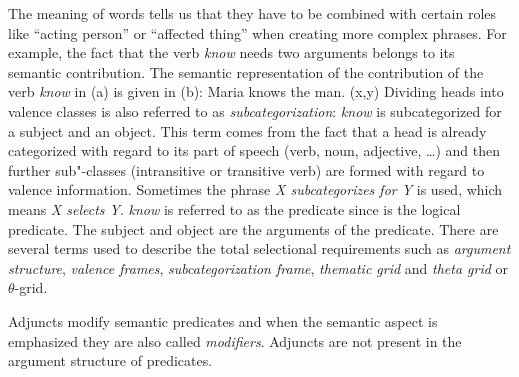 The meaning of words tells us that they have to be combined with certain roles like ``acting person'' or ``affected thing'' when creating more complex phrases.
For example, the fact that the verb \emph{know} needs two arguments belongs to its semantic contribution. The semantic representation of the contribution of the verb \emph{know} in (a) is given in (b):
\eal
\ex Maria knows the man.
\ex {}(x,y)
\zl
\noindent
Dividing heads into valence classes is also referred to as \emph{subcategorization}:\label{Seite-Subkategoriesierung} 
\emph{know} is subcategorized for a subject and an object.
This term comes from the fact that a head is already categorized with regard to its
part of speech (verb, noun, adjective, \ldots) and then further sub"-classes (\eg intransitive or
transitive verb) are formed with regard to valence information. Sometimes the phrase \emph{X subcategorizes for Y} is used, which means \emph{X selects Y}.
\emph{know} is referred to as the predicate since 
 is the logical predicate.
The subject and object are the arguments of the predicate. There are several terms used to describe the total selectional requirements such
as \emph{argument structure}, \emph{valence frames},
\emph{subcategorization frame}, \emph{thematic grid} and \emph{theta grid} or $\theta$-grid. 

Adjuncts modify semantic predicates and when the semantic aspect is emphasized they are
also called \emph{modifiers}. Adjuncts are not present in the argument structure
of predicates.

